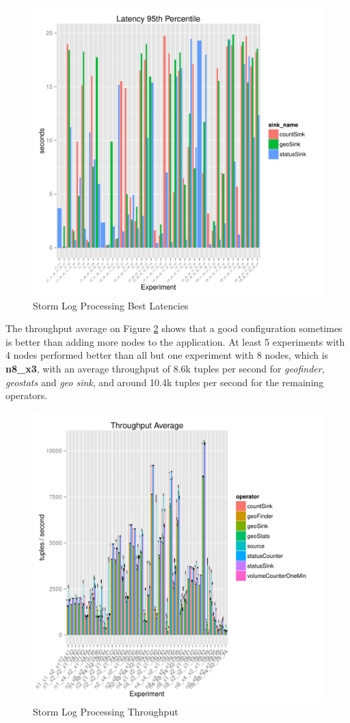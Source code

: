 \documentclass[ppgc,diss,english]{iiufrgs}
\begin{document}
\begin{figure}[H]
    \centering
	\includegraphics[width=.6\textwidth]{summaries/storm_logprocessing/best_latency.pdf}
	\caption{Storm Log Processing Best Latencies}
	\label{fig:storm_logprocessing_latency_best}
\end{figure}

The throughput average on Figure \ref{fig:storm_logprocessing_throughput} shows that a good configuration sometimes is better than adding more nodes to the application. At least 5 experiments with 4 nodes performed better than all but one experiment with 8 nodes, which is \textbf{n8\_x3}, with an average throughput of 8.6k tuples per second for \textit{geofinder}, \textit{geostats} and \textit{geo sink}, and around 10.4k tuples per second for the remaining operators.

\begin{figure}[H]
    \centering
	\includegraphics[width=.6\textwidth]{summaries/storm_logprocessing/full_throughput.pdf}
	\caption{Storm Log Processing Throughput}
	\label{fig:storm_logprocessing_throughput}
\end{figure}
\end{document}
